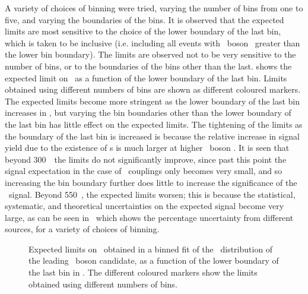 A variety of choices of binning were tried, varying the number of bins from one
to five, and varying the boundaries of the bins. It is observed that the
expected limits are most sensitive to the choice of the lower boundary of the last bin, which
is taken to be inclusive (i.e. including all events with \Z\ boson \pt\ greater
than the lower bin boundary). The limits are observed not to be very sensitive
to the number of bins, or to the boundaries of the bins other than the last.
 shows the expected limit on \ffourg\ as a function of the lower
boundary of the last bin. Limits obtained using different numbers of bins are
shown as different coloured markers. The expected limits become more stringent
as the lower boundary of the last bin increases in \pt, but varying the bin boundaries
other than the lower boundary of the last bin has little effect on the expected
limits.  The tightening of the limits as the boundary of the last bin is
increased is because the relative increase in signal yield due to the existence
of \TGC s is much larger at higher \Z\ boson \pt. It is seen that beyond
300~\gev\ the limits do not significantly improve, since past this point the
signal expectation in the case of \sm\ couplings only becomes very small, and so
increasing the bin boundary further does little to increase the significance of
the \TGC\ signal. Beyond 550~\gev, the expected limits worsen; this is because
the statistical, systematic, and theoretical uncertainties on the expected
signal become very large, as can be seen in~ which shows
the percentage uncertainty from different sources, for a variety of choices of
binning.

\begin{figure}[htbp]
\begin{center}
\caption{
\small
Expected limits on \ffourg\ obtained in a binned fit of the \pt\ distribution of
the leading \Z\ boson candidate, as a function of the lower boundary of the last bin
in \pt. The different coloured markers show the limits obtained using 
different numbers of bins.
 }
\label{fig:TGC-binOpt}
\end{center}
\end{figure}


